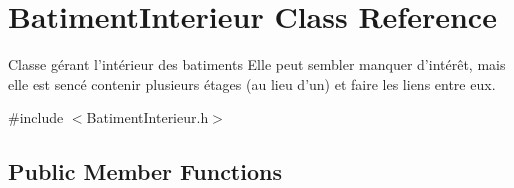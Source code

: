\hypertarget{classBatimentInterieur}{\section{Batiment\-Interieur Class Reference}
\label{classBatimentInterieur}
}


Classe gérant l'intérieur des batiments Elle peut sembler manquer d'intérêt, mais elle est sencé contenir plusieurs étages (au lieu d'un) et faire les liens entre eux.  




{\ttfamily \#include $<$Batiment\-Interieur.\-h$>$}

\subsection*{Public Member Functions}
